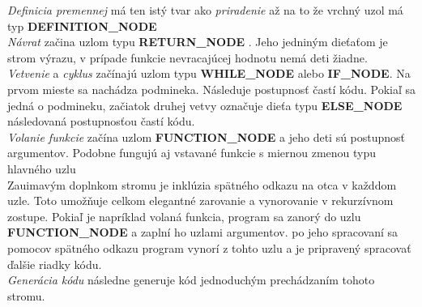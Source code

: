\documentclass[Slovak, a4paper, 12pt]{article}
\begin{document}
	\textit{Definicia premennej} má ten istý tvar ako \textit{priradenie} až na to že vrchný uzol má typ \textbf{DEFINITION\_NODE}\\[0.6em]
	\textit{Návrat} začina uzlom typu \textbf{RETURN\_NODE} . Jeho jedniným dieťaťom je strom výrazu, v prípade funkcie nevracajúcej hodnotu nemá deti žiadne.\\[0.6em]
	\textit{Vetvenie} a \textit{cyklus} začínajú uzlom typu \textbf{WHILE\_NODE} alebo \textbf{IF\_NODE}. Na prvom mieste sa nachádza podmineka.  Následuje postupnosť častí kódu. Pokiaľ sa jedná o podmineku, začiatok druhej vetvy označuje dieťa typu \textbf{ELSE\_NODE} následovaná postupnosťou častí kódu.\\[0.6em]
	\textit{Volanie funkcie} začína uzlom \textbf{FUNCTION\_NODE} a jeho deti sú postupnosť argumentov. Podobne fungujú aj vstavané funkcie s miernou zmenou 
	typu hlavného uzlu\\[0.6em]
	\noindent Zauimavým doplnkom stromu je inklúzia spätného odkazu na otca v každdom uzle. Toto umožňuje celkom elegantné zarovanie a vynorovanie v 
	rekurzívnom zostupe. Pokiaľ je napríklad volaná funkcia, program sa zanorý do uzlu \textbf{FUNCTION\_NODE} a zaplní ho uzlami argumentov. po jeho spracovaní sa pomocov spätného odkazu program vynorí z tohto uzlu a je pripravený spracovať ďalšie riadky kódu.\\[0.6em]
	\noindent \textit{Generácia kódu} následne generuje kód jednoduchým prechádzaním tohoto stromu.
	
\end{document}
